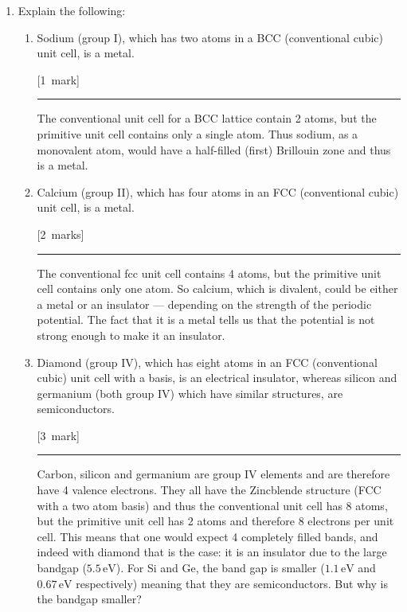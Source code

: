 \documentclass[12pt,a4paper]{article}
\newcommand{\unit}[1]{\ensuremath{\, \mathrm{#1}}}
\newcommand{\sepline}[0]{\par \hfil\rule{10cm}{0.4pt} \vspace*{\parskip}\hfil}
\begin{document}
\begin{enumerate}
\begin{enumerate}
\begin{enumerate}
\begin{answer}
						\end{answer}
					\end{enumerate}

					\item Explain the following:

					\begin{enumerate}
						\item Sodium (group I), which has two atoms in a BCC (conventional cubic) unit cell, is a metal.

						\hfill{[1~mark]}

						\begin{answer}

							\sepline

							The conventional unit cell for a BCC lattice contain 2 atoms, but the primitive unit cell contains only a single atom. Thus sodium, as a monovalent atom, would have a half-filled (first) Brillouin zone and thus is a metal.

						\end{answer}

						\item Calcium (group II), which has four atoms in an FCC (conventional cubic) unit cell, is a metal.

						\hfill{[2~marks]}

						\begin{answer}

							\sepline

							The conventional fcc unit cell contains 4 atoms, but the primitive unit cell contains only one atom. So calcium, which is divalent, could be either a metal or an insulator — depending on the strength of the periodic potential. The fact that it is a metal tells us that the potential	is not strong enough to make it an insulator.

						\end{answer}



						\item Diamond (group IV), which has eight atoms in an FCC (conventional cubic) unit cell with a basis, is an electrical insulator, whereas silicon and germanium (both group IV) which have similar structures, are semiconductors.

						\hfill{[3~mark]}

						\begin{answer}

							\sepline

							Carbon, silicon and germanium are group IV elements and are therefore have 4 valence electrons. They all have the Zincblende structure (FCC with a two atom basis) and thus the conventional unit cell has 8 atoms, but the primitive unit cell has 2 atoms and therefore 8 electrons per unit cell. This means that one would expect 4 completely filled bands, and indeed with diamond that is the case: it is an insulator due to the large bandgap ($5.5\unit{eV}$). For Si and Ge, the band gap is smaller ($1.1\unit{eV}$ and $0.67\unit{eV}$ respectively) meaning that they are semiconductors. But why is the bandgap smaller?


\end{answer}
\end{enumerate}
\end{enumerate}
\end{enumerate}
\end{document}
